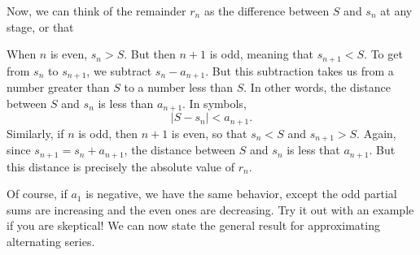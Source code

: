 \documentclass{ximera}
\begin{document}
\begin{model}
Now, we can think of the remainder $r_n$ as the difference between $S$ and $s_n$ at any stage, or that
\begin{image}
  \end{image}
When $n$ is even, $s_n > S$.  But then $n+1$ is odd, meaning that $s_{n+1} < S$.  To get from $s_n$ to $s_{n+1}$, we subtract $s_n - a_{n+1}$.  But this subtraction takes us from a number greater than $S$ to a number less than $S$.  In other words, the distance between $S$ and $s_n$ is less than $a_{n+1}$.  In symbols, 
\[
\vert S - s_n \vert < a_{n+1}.
\]
Similarly, if $n$ is odd, then $n+1$ is even, so that $s_n < S$ and $s_{n+1} > S$.  Again, since $s_{n+1} = s_n + a_{n+1}$, the distance between $S$ and $s_n$ is less that $a_{n+1}$.  But this distance is precisely the absolute value of $r_n$.

\end{model}

Of course, if $a_1$ is negative, we have the same behavior, except the odd partial sums are increasing and the even ones are decreasing.  Try it out with an example if you are skeptical!  We can now state the general result for approximating alternating series.


%
\end{document}
